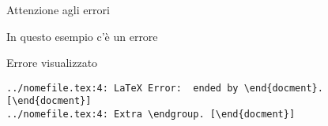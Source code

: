 \begin{frame}[fragile]{Attenzione agli errori}

\begin{exampleblock}{In questo esempio c'è un errore}
	
\end{exampleblock}

\pause

\begin{alertblock}{Errore visualizzato}
	\begin{lstlisting}
../nomefile.tex:4: LaTeX Error:  ended by \end{docment}. [\end{docment}]
../nomefile.tex:4: Extra \endgroup. [\end{docment}]
	\end{lstlisting}
\end{alertblock}

\end{frame}
